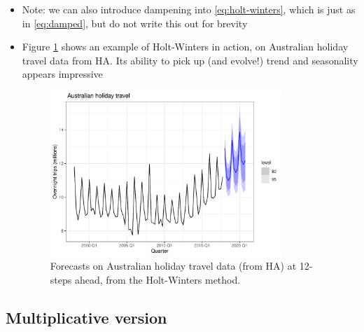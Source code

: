 \documentclass{article}
\begin{document}
\begin{itemize}
\item Note: we can also introduce dampening into \eqref{eq:holt-winters}, which
  is just as in \eqref{eq:damped}, but do not write this out for brevity

\item Figure \ref{fig:holiday} shows an example of Holt-Winters in action, on 
  Australian holiday travel data from HA. Its ability to pick up (and evolve!)
  trend and seasonality appears impressive

\begin{figure}[htb]
\centering
\includegraphics[width=0.825\textwidth]{fig/holiday-1.pdf}
\caption{Forecasts on Australian holiday travel data (from HA) at 12-steps
  ahead, from the Holt-Winters method.} 
\label{fig:holiday}
\end{figure}
\end{itemize}

\subsection{Multiplicative version}
\end{document}
